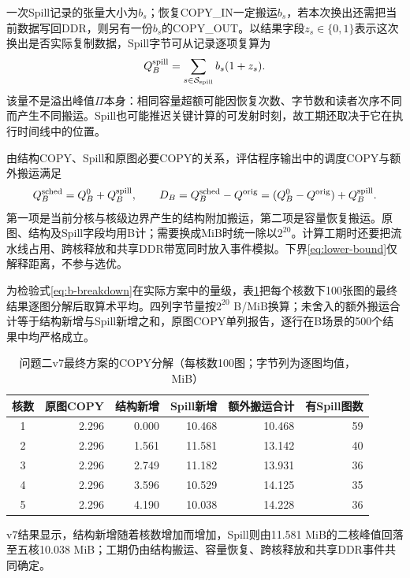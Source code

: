 一次Spill记录的张量大小为$b_s$；恢复COPY\_IN一定搬运$b_s$，若本次换出还需把当前数据写回DDR，则另有一份$b_s$的COPY\_OUT。以结果字段$z_s\in\{0,1\}$表示这次换出是否实际复制数据，Spill字节可从记录逐项复算为
\begin{equation}
Q_B^{\rm spill}=\sum_{s\in\mathcal S_{\rm spill}} b_s(1+z_s).
\label{eq:b-spill}
\end{equation}
该量不是溢出峰值$\Pi$本身：相同容量超额可能因恢复次数、字节数和读者次序不同而产生不同搬运。Spill也可能推迟关键计算的可发射时刻，故工期还取决于它在执行时间线中的位置。

由结构COPY、Spill和原图必要COPY的关系，评估程序输出中的调度COPY与额外搬运满足
\begin{equation}
Q_B^{\rm sched}=Q_B^0+Q_B^{\rm spill},\qquad
D_B=Q_B^{\rm sched}-Q^{\rm orig}
=(Q_B^0-Q^{\rm orig})+Q_B^{\rm spill}.
\label{eq:b-breakdown}
\end{equation}
第一项是当前分核与核级边界产生的结构附加搬运，第二项是容量恢复搬运。原图、结构及Spill字段均用B计；需要换成MiB时统一除以$2^{20}$。计算工期时还要把流水线占用、跨核释放和共享DDR带宽同时放入事件模拟。下界\eqref{eq:lower-bound}仅解释距离，不参与选优。

为检验式\eqref{eq:b-breakdown}在实际方案中的量级，表\ref{tab:b-copy-ledger}把每个核数下100张图的最终结果逐图分解后取算术平均。四列字节量按$2^{20}$ B/MiB换算；未舍入的额外搬运合计等于结构新增与Spill新增之和，原图COPY单列报告，逐行在B场景的500个结果中均严格成立。

\begin{table}[H]\centering\small
\caption{问题二v7最终方案的COPY分解（每核数100图；字节列为逐图均值，MiB）}\label{tab:b-copy-ledger}
\begin{tabular}{crrrrr}\toprule
核数 & 原图COPY & 结构新增 & Spill新增 & 额外搬运合计 & 有Spill图数\\\midrule
1 & 2.296 & 0.000 & 10.468 & 10.468 & 59\\
2 & 2.296 & 1.561 & 11.581 & 13.142 & 40\\
3 & 2.296 & 2.749 & 11.182 & 13.931 & 36\\
4 & 2.296 & 3.596 & 10.529 & 14.125 & 35\\
5 & 2.296 & 4.190 & 10.038 & 14.228 & 36\\\bottomrule
\end{tabular}\end{table}

v7结果显示，结构新增随着核数增加而增加，Spill则由11.581 MiB的二核峰值回落至五核10.038 MiB；工期仍由结构搬运、容量恢复、跨核释放和共享DDR事件共同确定。


